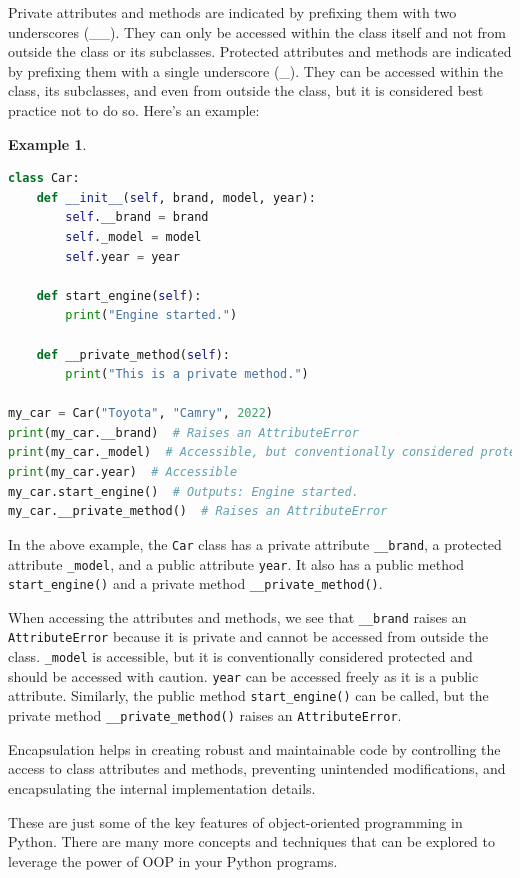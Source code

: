 \documentclass[12pt]{article}
\newtheorem{Example}{Example}[section]
\begin{document}
Private attributes and methods are indicated by prefixing them with two underscores (\_\_). They can only be accessed within the class itself and not from outside the class or its subclasses. Protected attributes and methods are indicated by prefixing them with a single underscore (\_). They can be accessed within the class, its subclasses, and even from outside the class, but it is considered best practice not to do so. Here's an example:

\begin{Example}
\begin{lstlisting}[language=Python]
class Car:
    def __init__(self, brand, model, year):
        self.__brand = brand
        self._model = model
        self.year = year

    def start_engine(self):
        print("Engine started.")

    def __private_method(self):
        print("This is a private method.")

my_car = Car("Toyota", "Camry", 2022)
print(my_car.__brand)  # Raises an AttributeError
print(my_car._model)  # Accessible, but conventionally considered protected
print(my_car.year)  # Accessible
my_car.start_engine()  # Outputs: Engine started.
my_car.__private_method()  # Raises an AttributeError
\end{lstlisting}
\end{Example}

In the above example, the \texttt{Car} class has a private attribute \texttt{\_\_brand}, a protected attribute \texttt{\_model}, and a public attribute \texttt{year}. It also has a public method \texttt{start\_engine()} and a private method \texttt{\_\_private\_method()}.

When accessing the attributes and methods, we see that \texttt{\_\_brand} raises an \texttt{AttributeError} because it is private and cannot be accessed from outside the class. \texttt{\_model} is accessible, but it is conventionally considered protected and should be accessed with caution. \texttt{year} can be accessed freely as it is a public attribute. Similarly, the public method \texttt{start\_engine()} can be called, but the private method \texttt{\_\_private\_method()} raises an \texttt{AttributeError}.

Encapsulation helps in creating robust and maintainable code by controlling the access to class attributes and methods, preventing unintended modifications, and encapsulating the internal implementation details.

These are just some of the key features of object-oriented programming in Python. There are many more concepts and techniques that can be explored to leverage the power of OOP in your Python programs.
\end{document}
